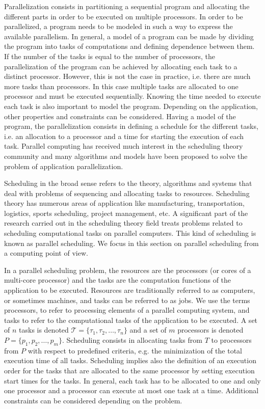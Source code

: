 Parallelization consists in partitioning a sequential program and allocating the different parts in order to be executed on multiple processors. In order to be parallelized, a program needs to be modeled in such a way to express the available parallelism. In general, a model of a program can be made by dividing the program into tasks of computations and defining dependence between them. 
If the number of the tasks is equal to the number of processors, the parallelization of the program can be achieved by allocating each task to a distinct processor. However, this is not the case in practice, i.e. there are much more tasks than processors. In this case multiple tasks are allocated to one processor and must be executed sequentially.  
Knowing the time needed to execute each task is also important to model the program. Depending on the application, other properties and constraints can be considered. Having a model of the program, the parallelization consists in defining a schedule for the different tasks, i.e. an allocation to a processor and a time for starting the execution of each task. Parallel computing has received much interest in the scheduling theory community and many algorithms and models have been proposed to solve the problem of application parallelization.   

Scheduling in the broad sense refers to the theory, algorithms and systems that deal with problems of sequencing and allocating tasks to resources. Scheduling theory has numerous areas of application like manufacturing, transportation, logistics, sports scheduling, project management, etc.%
 A significant part of the research carried out in the scheduling theory field treats problems related to scheduling computational tasks on parallel computers. This kind of scheduling is known as parallel scheduling. We focus in this section on parallel scheduling from a computing point of view.

In a parallel scheduling problem, the resources are the processors (or cores of a multi-core processor) and the tasks are the computation functions of the application to be executed. Resources are traditionally referred to as computers, or sometimes machines, and tasks can be referred to as jobs. We use the terms processors, to refer to processing elements of a parallel computing system, and tasks to refer to the computational tasks of the application to be executed. A set of $n$ tasks is denoted $\mathcal{T} = \{\tau_1, \tau_2, \ldots, \tau_n\}$ and a set of $m$ processors is denoted $P = \{p_1, p_2, \ldots, p_m\}$. Scheduling consists in allocating tasks from $T$ to processors from $P$ with respect to predefined criteria, e.g. the minimization of the total execution time of all tasks. Scheduling implies also the definition of an execution order for the tasks that are allocated to the same processor by setting execution start times for the tasks. In general, each task has to be allocated to one and only one processor and a processor can execute at most one task at a time. Additional constraints can be considered depending on the problem.

